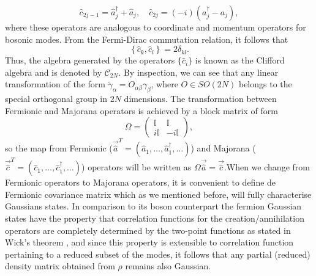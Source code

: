 \begin{equation}
\hat{c}_{2j-1}=\hat{a}_{j}^{\dagger}+\hat{a}_{j}, \quad \hat{c}_{2j}=(-i)\left(a_{j}^{\dagger}-a_{j}\right),
\label{CH2:majorana}
\end{equation}
where these operators are analogous to coordinate and momentum operators for bosonic modes. From the Fermi-Dirac commutation relation, it follows that
\begin{equation}
\left\{\hat{c}_{k},\hat{c}_{l}\right\}=2 \delta_{k l}.
\label{CH2:CAR_majorana}
\end{equation}
\indent Thus, the algebra generated by the operators $\{\hat{c}_i\}$ is known as the Clifford algebra and is denoted by $\mathcal{C}_{2N}$. By inspection, we can see that any linear transformation of the form $\tilde{\gamma}_{\alpha} = O_{\alpha\beta}\gamma_{\beta}$, where $O\in SO(2N)$ belongs to the special orthogonal group in $2N$  dimensions. The transformation between Fermionic and Majorana operators is achieved by a block matrix of form
\begin{equation}
\Omega=\left(\begin{array}{cc}
\mathbb{I} & \mathbb{I} \\
i \mathbb{I} & -i \mathbb{I}
\end{array}\right),
\end{equation}
so the map from Fermionic ($\vec{\hat{a}}^{T} = (\hat{a}_1,\ldots,\hat{a}_1^{\dagger},\ldots)$) and Majorana ($\vec{\hat{c}}^{T} = (\hat{c}_1,\ldots,\hat{c}_1^{\dagger},\ldots)$) operators will be written as $\Omega\vec{\hat{a}}=\vec{\hat{c}}$.When we change from Fermionic operators to Majorana operators, it is convenient to define de Fermionic covariance matrix which as we mentioned before, will fully characterise Gaussians states. In comparison to its boson counterpart the fermion Gaussian states have the property that correlation functions for the creation/annihilation operators are completely determined by the two-point functions as stated in Wick’s theorem \cite{westwanski_general_1973}, and since this property is extensible to correlation function pertaining to a reduced subset of the modes, it follows that any partial (reduced) density matrix obtained from $\rho$ remains also Gaussian.
 
